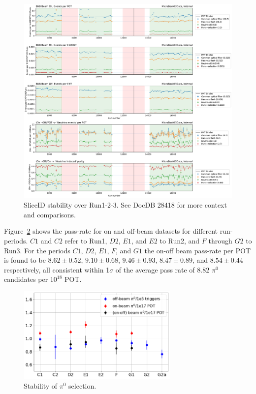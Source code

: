 \documentclass[a4paper]{article}
\begin{document}
\begin{figure}[H]
    \begin{center}
    \includegraphics[width=1.0\textwidth]{stability/events_per_exposure.pdf}
    \caption{SliceID stability over Run1-2-3. See DocDB 28418 for more context and comparisons.}
    \label{fig:stability:neutrinoID}
    \end{center}
\end{figure}

\par Figure~\ref{fig:stability:pi0} shows the pass-rate for on and off-beam datasets for different run-periods. $C1$ and $C2$ refer to Run1, $D2$, $E1$, and $E2$ to Run2, and $F$ through $G2$ to Run3. For the periods $C1$, $D2$, $E1$, $F$, and $G1$ the on-off beam pass-rate per POT is found to be $8.62\pm0.52$, $9.10\pm0.68$, $9.46\pm0.93$, $8.47\pm0.89$, and $8.54\pm0.44$ respectively, all consistent within 1$\sigma$ of the average pass rate of $8.82$ $\pi^0$ candidates per $10^{18}$ POT.

\begin{figure}[H]
    \begin{center}
    \includegraphics[width=0.7\textwidth]{stability/pi0stability.png}
    \caption{Stability of $\pi^0$ selection.}
    \label{fig:stability:pi0}
    \end{center}
\end{figure}
\end{document}
